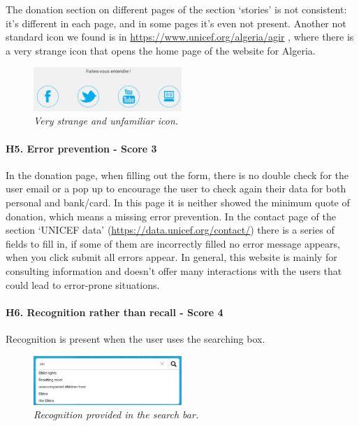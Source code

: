 \newline The donation section on different pages of the section ‘stories’ is not consistent: it’s different in each page, and in some pages it’s even not present.
\newline Another not standard icon we found is in \href{https://www.unicef.org/algeria/agir}{https://www.unicef.org/algeria/agir} , where there is a very strange icon that opens the home page of the website for Algeria.
\begin{figure}[!h]
	\begin{center}
		\includegraphics[width=0.5\textwidth]{FinalScores11.jpg}
		\captionsetup{font=small}
		\caption{\textit{Very strange and unfamiliar icon.}}
	\end{center}
\end{figure}
\newline
\newline \paragraph{H5. Error prevention - Score 3}	In the donation page, when filling out the form, there is no double check for the user email or a pop up to encourage the user to check again their data for both personal and bank/card.
In this page it is neither showed the minimum quote of donation, which means a missing error prevention.
\newline In the contact page of the section ‘UNICEF data’ (\href {https://data.unicef.org/contact/}{https://data.unicef.org/contact/}) there is a series of fields to fill in, if some of them are incorrectly filled no error message appears, when you click submit all errors appear.
\newline In general, this website is mainly for consulting information and doesn’t offer many interactions with the users that could lead to error-prone situations.
\newline
\newline \paragraph{H6. Recognition rather than recall - Score 4}	Recognition is present when the user uses the searching box.
\begin{figure}[!h]
	\begin{center}
		\includegraphics[width=0.5\textwidth]{FinalScores12.jpg}
		\captionsetup{font=small}
		\caption{\textit{Recognition provided in the search bar.}}
	\end{center}
\end{figure}
